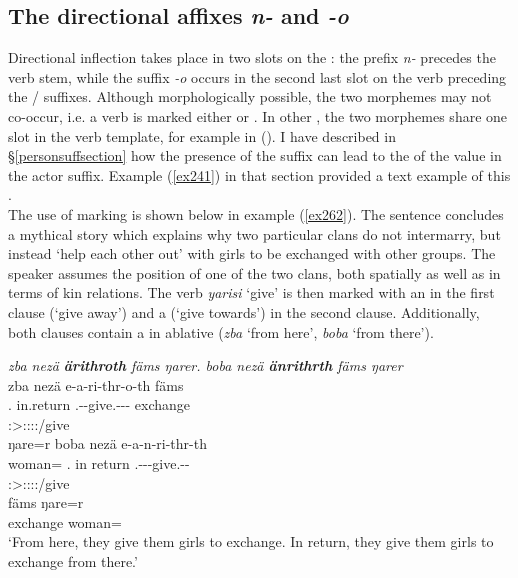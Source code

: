 \subsection{The directional affixes \emph{n-} and \emph{-o}} \label{directionalinflection}

Directional inflection takes place in two slots on the : the  prefix \emph{n-} precedes the verb stem, while the  suffix \emph{-o} occurs in the second last slot on the verb preceding the / suffixes. Although morphologically possible, the two morphemes may not co-occur, i.e. a verb is marked either  or . In other , the two morphemes share one slot in the verb template, for example in  (\citealt{Evans:2015to}). I have described in {\S{}\ref{personsuffsection}} how the presence of the  suffix can lead to the  of the  value in the actor suffix. Example (\ref{ex241}) in that section provided a text example of this .\\

The use of  marking is shown below in example (\ref{ex262}). The sentence concludes a mythical story which explains why two particular clans do not intermarry, but instead `help each other out' with girls to be exchanged with other groups. The speaker assumes the position of one of the two clans, both spatially as well as in terms of kin relations. The verb \emph{yarisi} `give' is then marked with an  in the first clause (`give away') and a  (`give towards') in the second clause. Additionally, both clauses contain a  in ablative  (\emph{zba} `from here', \emph{boba} `from there').

\begin{exe}
	\ex \emph{zba nezä \textbf{ärithroth} fäms ŋarer. boba nezä \textbf{änrithrth} fäms ŋarer}\\
	\glll zba nezä e-a-ri-thr-o-th fäms\\
	\Prox.\Abl{} in.return \Stnsg.\Alph-\Vc-give.\Ext-\Ndu-\Andat-\Nsg{} exchange\\
	{} {} \footnotesize{\Stpl:\Sbj>\Stpl:\Io:\Nonpast:\Ipfv:\Andat/give} {}\\
	\sn
	\glll ŋare=r boba nezä e-a-n-ri-thr-th\\
	woman=\Purp{} \Med.\Abl{} {in return} \Stnsg.\Alph-\Vc-\Venit-give.\Ext-\Ndu-\Stnsg{}\\
	{} {} {} \footnotesize{\Stpl:\Sbj>\Stpl:\Io:\Nonpast:\Ipfv:\Venit/give} {} {}\\
	\sn
	\gll fäms ŋare=r\\
	exchange woman=\Purp{}\\
	\trans `From here, they give them girls to exchange. In return, they give them girls to exchange from there.'
	\label{ex262}
\end{exe}

